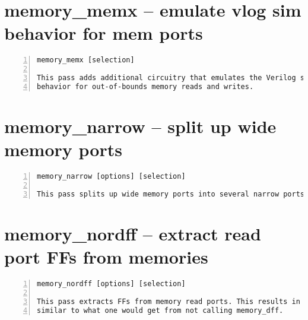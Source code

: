 \section{memory\_memx -- emulate vlog sim behavior for mem ports}
\label{cmd:memory_memx}
\begin{lstlisting}[numbers=left,frame=single]
    memory_memx [selection]

This pass adds additional circuitry that emulates the Verilog simulation
behavior for out-of-bounds memory reads and writes.
\end{lstlisting}

\section{memory\_narrow -- split up wide memory ports}
\label{cmd:memory_narrow}
\begin{lstlisting}[numbers=left,frame=single]
    memory_narrow [options] [selection]

This pass splits up wide memory ports into several narrow ports.
\end{lstlisting}

\section{memory\_nordff -- extract read port FFs from memories}
\label{cmd:memory_nordff}
\begin{lstlisting}[numbers=left,frame=single]
    memory_nordff [options] [selection]

This pass extracts FFs from memory read ports. This results in a netlist
similar to what one would get from not calling memory_dff.
\end{lstlisting}

